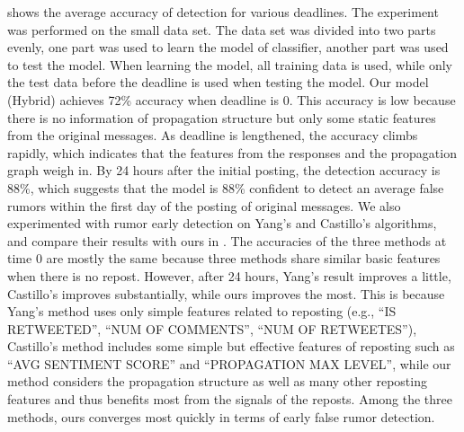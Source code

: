  shows the average accuracy of detection
for various deadlines. The experiment was performed on the small
data set. The data set was divided into two parts evenly,
one part was used to learn the model of classifier,
another part was used to test the model.
When learning the model, all training data is used,
while only the test data before the deadline is
used when testing the model.
Our model (Hybrid) achieves 72\% accuracy when deadline is 0.
This accuracy is low because there is no information
of propagation structure but only some static features from
the original messages.
As deadline is lengthened, the accuracy climbs rapidly, which
indicates that the features from the responses and the propagation graph
weigh in. By 24 hours after the initial posting, the detection
accuracy is 88\%, which suggests that the model
is 88\% confident to detect an average false rumors within the first
day of the posting of original messages.
We also experimented with rumor early detection on
Yang's\cite{yang2012automatic} and Castillo's\cite{castillo2011information} 
algorithms, and compare their results with ours in .
The accuracies of the three methods at time 0 are mostly
the same because three methods share similar basic features when
there is no repost. However, after 24 hours, Yang's result improves a little,
Castillo's improves substantially, while ours improves the most.
This is because Yang's method uses only simple features related to reposting
(e.g., ``IS RETWEETED'', ``NUM OF COMMENTS'', ``NUM OF RETWEETES''),
Castillo's method includes some simple but effective features of
reposting such as ``AVG SENTIMENT SCORE'' and ``PROPAGATION MAX LEVEL'',
while our method considers the propagation structure as well as
many other reposting features and thus benefits most from the signals of
the reposts. Among the three methods, ours converges most quickly in terms of
early false rumor detection.
